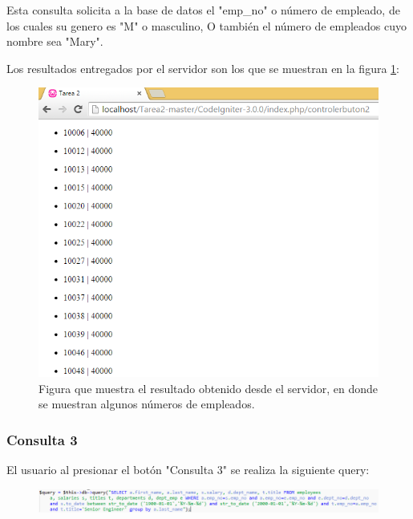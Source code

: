 Esta consulta solicita a la base de datos el "emp\_no" o número de empleado, de los cuales su genero es "M" o masculino, O también el número de empleados cuyo nombre sea "Mary".

Los resultados entregados por el servidor son los que se muestran en la figura \ref{Figura5}:

\begin{figure}[htb]
	\label{Figura5}
	\begin{center}
		\includegraphics[scale=0.7]{imagenes/resultado2.png}
		\caption{Figura que muestra el resultado obtenido desde el servidor, en donde se muestran algunos números de empleados.}
	\end{center}
\end{figure}

\subsubsection{Consulta 3}

El usuario al presionar el botón "Consulta 3" se realiza la siguiente query:

\begin{figure}[htb]
	\label{Figura6}
	\begin{center}
		\includegraphics[scale=0.7]{imagenes/query3.png}
	\end{center}
\end{figure}

